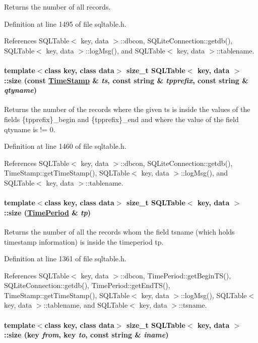 Returns the number of all records. 

Definition at line 1495 of file sqltable.h.

References SQLTable$<$ key, data $>$::dbcon, SQLite\-Connection::getdb(), SQLTable$<$ key, data $>$::log\-Msg(), and SQLTable$<$ key, data $>$::tablename.\hypertarget{classSQLTable_SQLTablea28}{
\paragraph[size]{\setlength{\rightskip}{0pt plus 5cm}template$<$class key, class data$>$ size\_\-t SQLTable$<$ key, data $>$::size (const \hyperlink{classTimeStamp}{Time\-Stamp} \& {\em ts}, const string \& {\em tpprefix}, const string \& {\em qtyname})}\hfill}
\label{classSQLTable_SQLTablea28}


Returns the number of the records where the given ts is inside the values of the fields \{tpprefix\}\_\-begin and \{tpprefix\}\_\-end and where the value of the field qtyname is != 0. 

Definition at line 1460 of file sqltable.h.

References SQLTable$<$ key, data $>$::dbcon, SQLite\-Connection::getdb(), Time\-Stamp::get\-Time\-Stamp(), SQLTable$<$ key, data $>$::log\-Msg(), and SQLTable$<$ key, data $>$::tablename.\hypertarget{classSQLTable_SQLTablea27}{
\paragraph[size]{\setlength{\rightskip}{0pt plus 5cm}template$<$class key, class data$>$ size\_\-t SQLTable$<$ key, data $>$::size (\hyperlink{classTimePeriod}{Time\-Period} \& {\em tp})}\hfill}
\label{classSQLTable_SQLTablea27}


Returns the number of all the records whom the field tsname (which holds timestamp information) is inside the timeperiod tp. 

Definition at line 1361 of file sqltable.h.

References SQLTable$<$ key, data $>$::dbcon, Time\-Period::get\-Begin\-TS(), SQLite\-Connection::getdb(), Time\-Period::get\-End\-TS(), Time\-Stamp::get\-Time\-Stamp(), SQLTable$<$ key, data $>$::log\-Msg(), SQLTable$<$ key, data $>$::tablename, and SQLTable$<$ key, data $>$::tsname.\hypertarget{classSQLTable_SQLTablea26}{
\paragraph[size]{\setlength{\rightskip}{0pt plus 5cm}template$<$class key, class data$>$ size\_\-t SQLTable$<$ key, data $>$::size (key {\em from}, key {\em to}, const string \& {\em iname})}\hfill}
\label{classSQLTable_SQLTablea26}


